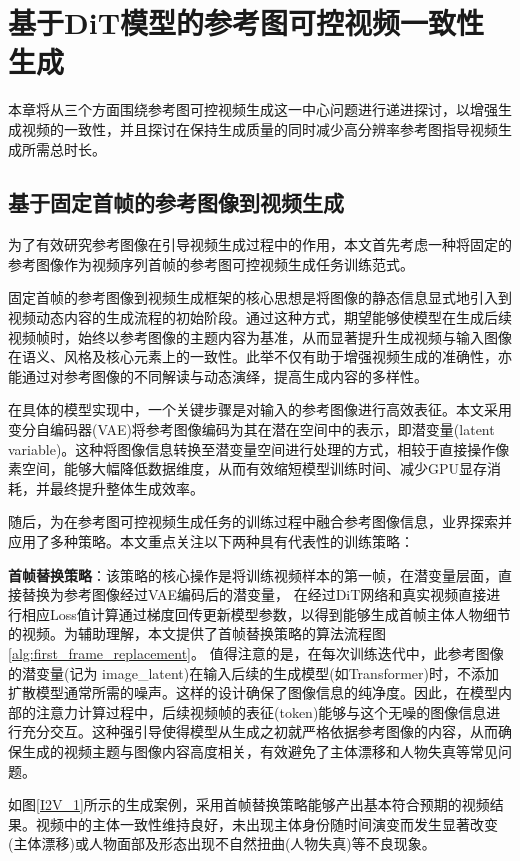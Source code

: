 \cleardoublepage
\section{基于DiT模型的参考图可控视频一致性生成}
本章将从三个方面围绕参考图可控视频生成这一中心问题进行递进探讨，以增强生成视频的一致性，并且探讨在保持生成质量的同时减少高分辨率参考图指导视频生成所需总时长。
\subsection{基于固定首帧的参考图像到视频生成}\label{sec1}
为了有效研究参考图像在引导视频生成过程中的作用，本文首先考虑一种将固定的参考图像作为视频序列首帧的参考图可控视频生成任务训练范式。

固定首帧的参考图像到视频生成框架的核心思想是将图像的静态信息显式地引入到视频动态内容的生成流程的初始阶段。通过这种方式，期望能够使模型在生成后续视频帧时，始终以参考图像的主题内容为基准，从而显著提升生成视频与输入图像在语义、风格及核心元素上的一致性。此举不仅有助于增强视频生成的准确性，亦能通过对参考图像的不同解读与动态演绎，提高生成内容的多样性。

在具体的模型实现中，一个关键步骤是对输入的参考图像进行高效表征。本文采用变分自编码器(VAE)将参考图像编码为其在潜在空间中的表示，即潜变量(latent variable)。这种将图像信息转换至潜变量空间进行处理的方式，相较于直接操作像素空间，能够大幅降低数据维度，从而有效缩短模型训练时间、减少GPU显存消耗，并最终提升整体生成效率。

随后，为在参考图可控视频生成任务的训练过程中融合参考图像信息，业界探索并应用了多种策略。本文重点关注以下两种具有代表性的训练策略：

\textbf{首帧替换策略}：该策略的核心操作是将训练视频样本的第一帧，在潜变量层面，直接替换为参考图像经过VAE编码后的潜变量， 在经过DiT网络和真实视频直接进行相应Loss值计算通过梯度回传更新模型参数，以得到能够生成首帧主体人物细节的视频。为辅助理解，本文提供了首帧替换策略的算法流程图\ref{alg:first_frame_replacement}。 值得注意的是，在每次训练迭代中，此参考图像的潜变量(记为 image\_latent)在输入后续的生成模型(如Transformer)时，不添加扩散模型通常所需的噪声。这样的设计确保了图像信息的纯净度。因此，在模型内部的注意力计算过程中，后续视频帧的表征(token)能够与这个无噪的图像信息进行充分交互。这种强引导使得模型从生成之初就严格依据参考图像的内容，从而确保生成的视频主题与图像内容高度相关，有效避免了主体漂移和人物失真等常见问题。
 
如图\ref{I2V_1}所示的生成案例，采用首帧替换策略能够产出基本符合预期的视频结果。视频中的主体一致性维持良好，未出现主体身份随时间演变而发生显著改变(主体漂移)或人物面部及形态出现不自然扭曲(人物失真)等不良现象。

